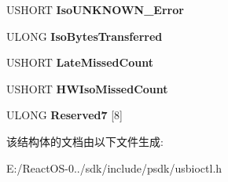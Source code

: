 \begin{DoxyCompactItemize}
\item 
\mbox{\label{struct___h_c_d___i_s_o___s_t_a_t___c_o_u_n_t_e_r_s_a1d1af240863fbaa056602dcbf0b8a2d9}} 
U\+S\+H\+O\+RT {\bfseries Iso\+U\+N\+K\+N\+O\+W\+N\+\_\+\+Error}
\item 
\mbox{\label{struct___h_c_d___i_s_o___s_t_a_t___c_o_u_n_t_e_r_s_a1a45c20116267dcdf58113393a345459}} 
U\+L\+O\+NG {\bfseries Iso\+Bytes\+Transferred}
\item 
\mbox{\label{struct___h_c_d___i_s_o___s_t_a_t___c_o_u_n_t_e_r_s_af4727a32f025d77d8aa768dbf853e572}} 
U\+S\+H\+O\+RT {\bfseries Late\+Missed\+Count}
\item 
\mbox{\label{struct___h_c_d___i_s_o___s_t_a_t___c_o_u_n_t_e_r_s_aed08da03a2af94d1bbd978a303a51eec}} 
U\+S\+H\+O\+RT {\bfseries H\+W\+Iso\+Missed\+Count}
\item 
\mbox{\label{struct___h_c_d___i_s_o___s_t_a_t___c_o_u_n_t_e_r_s_a5574f531539d8eaccb3e653117802977}} 
U\+L\+O\+NG {\bfseries Reserved7} \mbox{[}8\mbox{]}
\end{DoxyCompactItemize}


该结构体的文档由以下文件生成\+:\begin{DoxyCompactItemize}
\item 
E\+:/\+React\+O\+S-\/0../sdk/include/psdk/usbioctl.\+h\end{DoxyCompactItemize}
